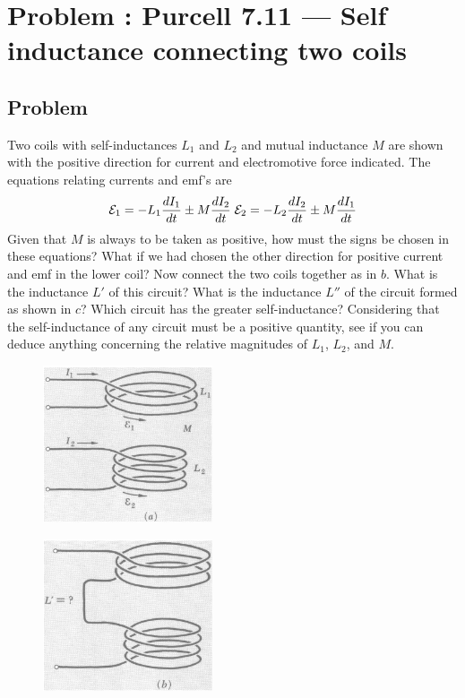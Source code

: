 \documentclass[solutions]{esg8022pset}
\begin{document}
\section{Problem \thesection: Purcell 7.11 --- Self inductance connecting two coils}
\subsection{Problem}
Two coils with self-inductances $L_1$ and $L_2$ and mutual inductance $M$  are shown with the positive direction for current and electromotive force indicated. The equations relating currents and emf's are
\begin{equation}
{\cal E}_1 = -L_1\frac{dI_1}{dt}\pm M\frac{dI_2}{dt} \; {\cal E}_2 = -L_2\frac{dI_2}{dt}\pm M\frac{dI_1}{dt}
\end{equation}
Given that $M$ is always to be taken as positive, how must the signs be chosen in these equations? What if we had chosen the other direction for positive current and emf in the lower coil? Now connect the two coils together as in $b$. What is the inductance $L'$ of this circuit? What is the inductance $L''$ of the circuit formed as shown in $c$? Which circuit has the greater self-inductance? Considering that the self-inductance of any circuit must be a positive quantity, see if you can deduce anything concerning the relative magnitudes of $L_1$, $L_2$, and $M$.


  \begin{figure}[H]
    \centering
    \includegraphics[width = 5cm]{pu711a}
    \label{fig:crossbar}
  \end{figure}


  \begin{figure}[H]
    \centering
    \includegraphics[width = 5cm]{pu711b}
    \label{fig:crossbar}
  \end{figure}
\end{document}
